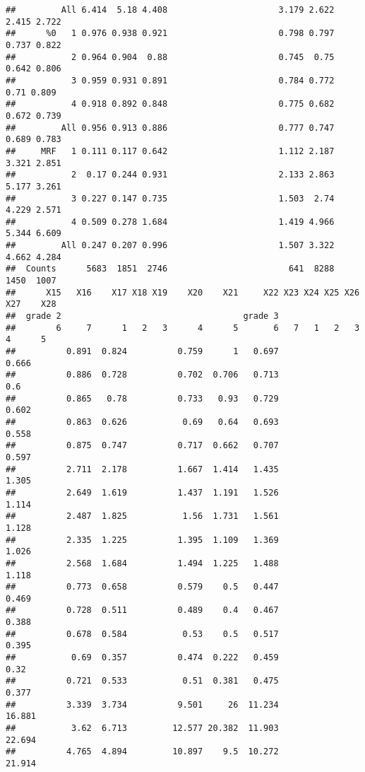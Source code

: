 \documentclass[
]{article}
\begin{document}
\begin{verbatim}
##         All 6.414  5.18 4.408                      3.179 2.622 2.415 2.722
##      %0   1 0.976 0.938 0.921                      0.798 0.797 0.737 0.822
##           2 0.964 0.904  0.88                      0.745  0.75 0.642 0.806
##           3 0.959 0.931 0.891                      0.784 0.772  0.71 0.809
##           4 0.918 0.892 0.848                      0.775 0.682 0.672 0.739
##         All 0.956 0.913 0.886                      0.777 0.747 0.689 0.783
##     MRF   1 0.111 0.117 0.642                      1.112 2.187 3.321 2.851
##           2  0.17 0.244 0.931                      2.133 2.863 5.177 3.261
##           3 0.227 0.147 0.735                      1.503  2.74 4.229 2.571
##           4 0.509 0.278 1.684                      1.419 4.966 5.344 6.609
##         All 0.247 0.207 0.996                      1.507 3.322 4.662 4.284
##  Counts      5683  1851  2746                        641  8288  1450  1007
##      X15   X16    X17 X18 X19    X20    X21     X22 X23 X24 X25 X26 X27    X28
##  grade 2                                    grade 3                           
##        6     7      1   2   3      4      5       6   7   1   2   3   4      5
##          0.891  0.824          0.759      1   0.697                      0.666
##          0.886  0.728          0.702  0.706   0.713                        0.6
##          0.865   0.78          0.733   0.93   0.729                      0.602
##          0.863  0.626           0.69   0.64   0.693                      0.558
##          0.875  0.747          0.717  0.662   0.707                      0.597
##          2.711  2.178          1.667  1.414   1.435                      1.305
##          2.649  1.619          1.437  1.191   1.526                      1.114
##          2.487  1.825           1.56  1.731   1.561                      1.128
##          2.335  1.225          1.395  1.109   1.369                      1.026
##          2.568  1.684          1.494  1.225   1.488                      1.118
##          0.773  0.658          0.579    0.5   0.447                      0.469
##          0.728  0.511          0.489    0.4   0.467                      0.388
##          0.678  0.584           0.53    0.5   0.517                      0.395
##           0.69  0.357          0.474  0.222   0.459                       0.32
##          0.721  0.533           0.51  0.381   0.475                      0.377
##          3.339  3.734          9.501     26  11.234                     16.881
##           3.62  6.713         12.577 20.382  11.903                     22.694
##          4.765  4.894         10.897    9.5  10.272                     21.914

\end{verbatim}
\end{document}
